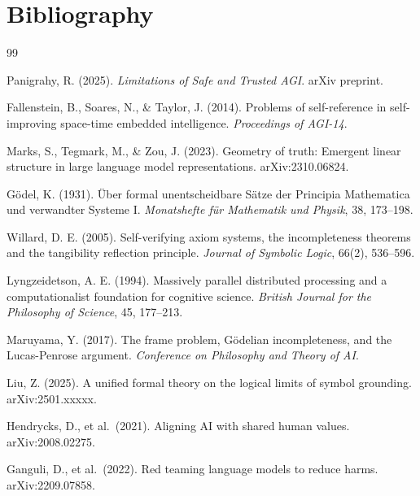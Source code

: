 \documentclass[11pt,a4paper]{article}
\theoremstyle{definition}
\theoremstyle{remark}
\begin{document}
\section*{Bibliography}
\label{app:bibliography}

\begin{thebibliography}{99}

Panigrahy, R. (2025).
\textit{Limitations of Safe and Trusted AGI}.
arXiv preprint.

Fallenstein, B., Soares, N., \& Taylor, J. (2014).
Problems of self-reference in self-improving space-time
embedded intelligence.
\textit{Proceedings of AGI-14}.

Marks, S., Tegmark, M., \& Zou, J. (2023).
Geometry of truth: Emergent linear structure
in large language model representations.
arXiv:2310.06824.

Gödel, K. (1931).
Über formal unentscheidbare Sätze der Principia Mathematica
und verwandter Systeme I.
\textit{Monatshefte für Mathematik und Physik}, 38, 173--198.

Willard, D. E. (2005).
Self-verifying axiom systems, the incompleteness theorems
and the tangibility reflection principle.
\textit{Journal of Symbolic Logic}, 66(2), 536--596.

Lyngzeidetson, A. E. (1994).
Massively parallel distributed processing
and a computationalist foundation for cognitive science.
\textit{British Journal for the Philosophy of Science}, 45, 177--213.

Maruyama, Y. (2017).
The frame problem, Gödelian incompleteness,
and the Lucas-Penrose argument.
\textit{Conference on Philosophy and Theory of AI}.

Liu, Z. (2025).
A unified formal theory on the logical limits of
symbol grounding.
arXiv:2501.xxxxx.

Hendrycks, D., et al.\ (2021).
Aligning AI with shared human values.
arXiv:2008.02275.

Ganguli, D., et al.\ (2022).
Red teaming language models to reduce harms.
arXiv:2209.07858.


\end{thebibliography}
\end{document}

